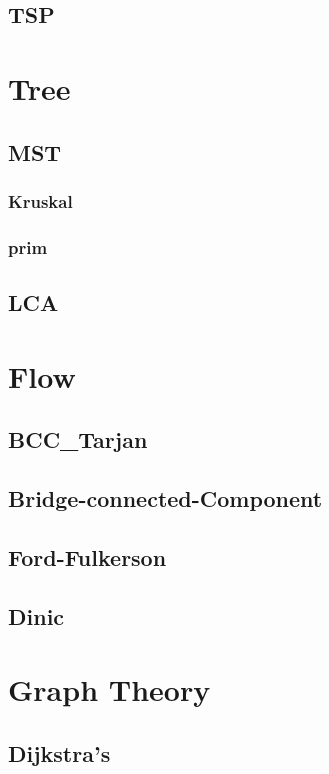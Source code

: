 	\subsection{TSP}
		
\section{Tree}
	\subsection{MST}
        \subsubsection{Kruskal}
            
        \subsubsection{prim}
            
	\subsection{LCA}
		
\section{Flow}
	\subsection{BCC\_Tarjan}
		
	\subsection{Bridge-connected-Component}
		
	\subsection{Ford-Fulkerson}
		
	\subsection{Dinic}
		
\section{Graph Theory}
	\subsection{Dijkstra’s}
		
